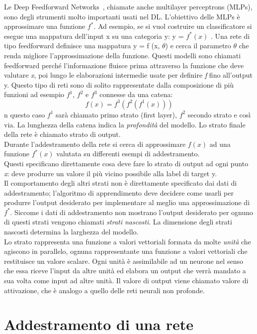       
     Le Deep Feedforward Networks~\cite{tesi}, chiamate anche multilayer perceptrons (MLPs), 
     sono degli strumenti molto importanti usati nel DL.
     L’obiettivo delle MLPs è approssimare una funzione $f^{*}$. 
     Ad esempio, se si vuol costruire un classificatore si esegue una mappatura
     dell’input x su una categoria y: y = $f^{*}(x)$ . Una rete di tipo feedforward definisce una mappatura 
     y = f (x, \(\theta\)) e cerca il parametro \(\theta\) che renda migliore l’approssimazione
      della funzione.
     Questi modelli sono chiamati feedforward perché l’informazione fluisce prima attraverso
     la funzione che deve valutare \emph{x}, poi lungo le elaborazioni intermedie usate per definire \emph{f}
     fino all’output y. 
     Questo tipo di reti sono di solito rappresentate dalla composizione di più funzioni ad
esempio $f^{1}$, $f^{2}$ e $f^{3}$ connesse da una catena:
 $$f(x) = f^{3}(f^{2}(f^{1}(x)))$$
n questo caso $f^{1}$ sarà chiamato primo strato (first layer), $f^{2}$ secondo strato e così via.
La lunghezza della catena indica la \emph{profondità} del modello. Lo strato finale della rete è
chiamato strato di output. \\
Durante l’addestramento della rete si cerca di approssimare 
$f (x)$ ad una funzione $f^{*}(x)$ valutata su differenti esempi di addestramento. \\
Questi specificano direttamente cosa deve fare lo strato
di output ad ogni punto \emph{x}: deve produrre un valore il più vicino possibile alla label di target y. \\
Il 
comportamento degli altri strati non è direttamente specificato dai dati di addestramento;
l’algoritmo di apprendimento deve decidere come usarli per produrre l’output desiderato
per implementare al meglio una approssimazione di $f^{*}$. Siccome i dati di addestramento 
non mostrano l’output desiderato per ognuno di questi strati vengono chiamati \emph{strati
nascosti}. La dimensione degli strati nascosti determina la larghezza del modello.\\
Lo strato rappresenta una funzione a valori vettoriali formata da molte \emph{unità} che agiscono in
parallelo, ognuna rappresentante una funzione a valori vettoriali che restituisce un valore
scalare. Ogni unità è assimilabile ad un neurone nel senso che essa riceve l’input da altre
unità ed elabora un output che verrà mandato a sua volta come input ad altre unità. Il
valore di output viene chiamato valore di attivazione, che è analogo a quello delle reti neurali non profonde. 
\section{Addestramento di una rete}

